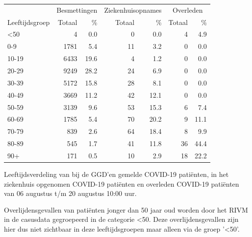 \documentclass[
  english,
  man,floatsintext]{apa6}
\begin{document}
\begin{table}
\centering\begingroup\fontsize{11}{13}\selectfont

\begin{threeparttable}
\begin{tabular}{lrrrrrr}
\toprule
\multicolumn{1}{c}{ } & \multicolumn{2}{c}{Besmettingen} & \multicolumn{2}{c}{Ziekenhuisopnames} & \multicolumn{2}{c}{Overleden} \\
\cmidrule(l{3pt}r{3pt}){2-3} \cmidrule(l{3pt}r{3pt}){4-5} \cmidrule(l{3pt}r{3pt}){6-7}
Leeftijdsgroep & Totaal & \% & Totaal & \% & Totaal & \%\\
\midrule
<50 & 4 & 0.0 & 0 & 0.0 & 4 & 4.9\\
0-9 & 1781 & 5.4 & 11 & 3.2 & 0 & 0.0\\
10-19 & 6433 & 19.6 & 4 & 1.2 & 0 & 0.0\\
20-29 & 9249 & 28.2 & 24 & 6.9 & 0 & 0.0\\
30-39 & 5172 & 15.8 & 28 & 8.1 & 0 & 0.0\\
40-49 & 3669 & 11.2 & 42 & 12.1 & 0 & 0.0\\
50-59 & 3139 & 9.6 & 53 & 15.3 & 6 & 7.4\\
60-69 & 1785 & 5.4 & 70 & 20.2 & 9 & 11.1\\
70-79 & 839 & 2.6 & 64 & 18.4 & 8 & 9.9\\
80-89 & 545 & 1.7 & 41 & 11.8 & 36 & 44.4\\
90+ & 171 & 0.5 & 10 & 2.9 & 18 & 22.2\\
\bottomrule
\end{tabular}
\begin{tablenotes}
\item[1] Leeftijdsverdeling van bij de GGD’en gemelde COVID-19 patiënten, in het ziekenhuis opgenomen COVID-19 patiënten en overleden COVID-19 patiënten van 06 augustus t/m 20 augustus 10:00 uur.
\item[2] Overlijdensgevallen van patiënten jonger dan 50 jaar oud worden door het RIVM in de casusdata gegroepeerd in de categorie <50. Deze overlijdensgevallen zijn hier dus niet zichtbaar in deze leeftijdsgroepen maar alleen via de groep '<50'.
\end{tablenotes}
\end{threeparttable}
\endgroup{}
\end{table}

\newpage
\end{document}
